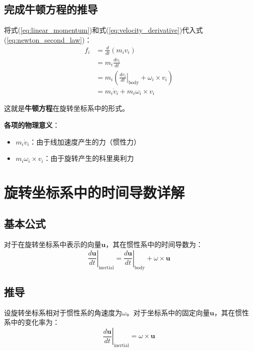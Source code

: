 \documentclass[12pt,a4paper]{article}
\begin{document}
\subsection{完成牛顿方程的推导}

将式(\ref{eq:linear_momentum})和式(\ref{eq:velocity_derivative})代入式(\ref{eq:newton_second_law})：
\begin{align}
f_i &= \frac{d}{dt}(m_i v_i) \\
&= m_i \frac{dv_i}{dt} \\
&= m_i \left(\left.\frac{dv_i}{dt}\right|_{\text{body}} + \omega_i \times v_i\right) \\
&= m_i \dot{v}_i + m_i \omega_i \times v_i
\label{eq:newton_final}
\end{align}

这就是\textbf{牛顿方程}在旋转坐标系中的形式。

\textbf{各项的物理意义}：
\begin{itemize}
\item $m_i \dot{v}_i$：由于线加速度产生的力（惯性力）
\item $m_i \omega_i \times v_i$：由于旋转产生的科里奥利力
\end{itemize}

\section{旋转坐标系中的时间导数详解}

\subsection{基本公式}

对于在旋转坐标系中表示的向量$\bm{u}$，其在惯性系中的时间导数为：
\begin{equation}
\left.\frac{d\bm{u}}{dt}\right|_{\text{inertial}} = \left.\frac{d\bm{u}}{dt}\right|_{\text{body}} + \omega \times \bm{u}
\label{eq:rotating_derivative_general}
\end{equation}

\subsection{推导}

设旋转坐标系相对于惯性系的角速度为$\omega$。对于坐标系中的固定向量$\bm{u}$，其在惯性系中的变化率为：
\begin{equation}
\left.\frac{d\bm{u}}{dt}\right|_{\text{inertial}} = \omega \times \bm{u}
\end{equation}
\end{document}
